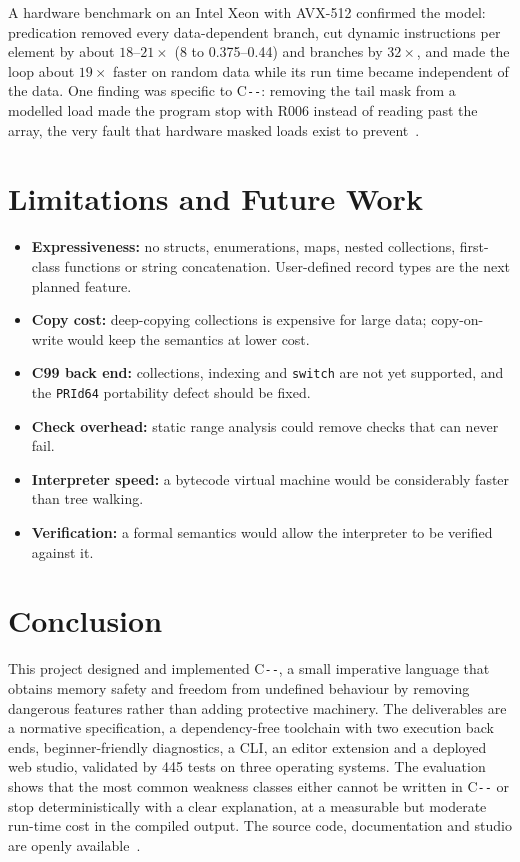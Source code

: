 \documentclass[conference]{IEEEtran}
\newcommand{\cmm}{C\texttt{-{}-}}
\begin{document}
A hardware benchmark on an Intel Xeon with AVX-512 confirmed the model: predication removed every
data-dependent branch, cut dynamic instructions per element by about $18\text{--}21\times$ (8 to
0.375--0.44) and branches by $32\times$, and made the loop about $19\times$ faster on random data while its run
time became independent of the data. One finding was specific to \cmm{}: removing the tail mask
from a modelled load made the program stop with R006 instead of reading past the array, the very fault that
hardware masked loads exist to prevent~\cite{ifconversion}.

\section{Limitations and Future Work}\label{sec:future}
\begin{itemize}
  \item \textbf{Expressiveness:} no structs, enumerations, maps, nested collections, first-class functions or
        string concatenation. User-defined record types are the next planned feature.
  \item \textbf{Copy cost:} deep-copying collections is expensive for large data; copy-on-write would keep
        the semantics at lower cost.
  \item \textbf{C99 back end:} collections, indexing and \texttt{switch} are not yet supported, and the
        \texttt{PRId64} portability defect should be fixed.
  \item \textbf{Check overhead:} static range analysis could remove checks that can never fail.
  \item \textbf{Interpreter speed:} a bytecode virtual machine would be considerably faster than tree walking.
  \item \textbf{Verification:} a formal semantics would allow the interpreter to be verified against it.
\end{itemize}

\section{Conclusion}
This project designed and implemented \cmm{}, a small imperative language that obtains memory safety and
freedom from undefined behaviour by removing dangerous features rather than adding protective machinery.
The deliverables are a normative specification, a dependency-free toolchain with two execution back ends,
beginner-friendly diagnostics, a CLI, an editor extension and a deployed web studio, validated by 445 tests on
three operating systems. The evaluation shows that the most common weakness classes either cannot be written
in \cmm{} or stop deterministically with a clear explanation, at a measurable but moderate run-time cost in the
compiled output. The source code, documentation and studio are openly available~\cite{cmm_repo}.
\end{document}
